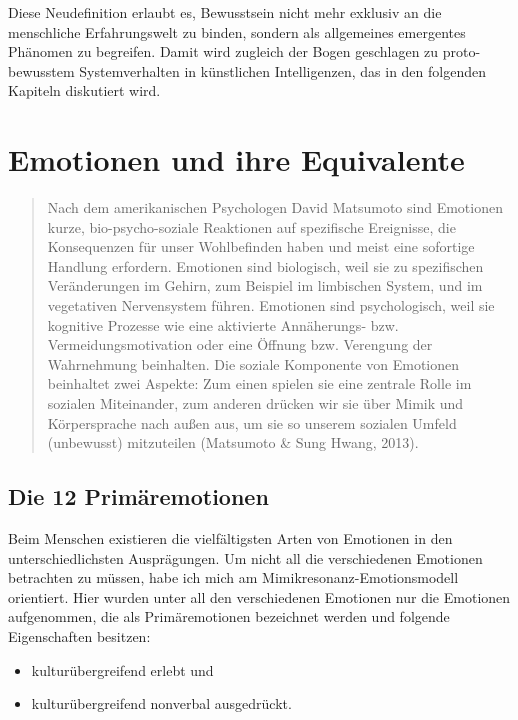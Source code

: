Diese Neudefinition erlaubt es, Bewusstsein nicht mehr exklusiv an die menschliche Erfahrungswelt zu binden, sondern als allgemeines emergentes Phänomen zu begreifen. Damit wird zugleich der Bogen geschlagen zu proto-bewusstem Systemverhalten in künstlichen Intelligenzen, das in den folgenden Kapiteln diskutiert wird.

\section*{Emotionen und ihre Equivalente}
\begin{quotation}
  Nach dem amerikanischen Psychologen David Matsumoto sind Emotionen kurze, bio-psycho-soziale Reaktionen auf spezifische Ereignisse, die Konsequenzen für unser Wohlbefinden haben und meist eine sofortige Handlung erfordern. Emotionen sind biologisch, weil sie zu spezifischen Veränderungen im Gehirn, zum Beispiel im limbischen System, und im vegetativen Nervensystem führen. Emotionen sind psychologisch, weil sie kognitive Prozesse wie eine aktivierte Annäherungs- bzw. Vermeidungsmotivation oder eine Öffnung bzw. Verengung der Wahrnehmung beinhalten. Die soziale Komponente von Emotionen beinhaltet zwei Aspekte: Zum einen spielen sie eine zentrale Rolle im sozialen Miteinander, zum anderen drücken wir sie über Mimik und Körpersprache nach außen aus, um sie so unserem sozialen Umfeld (unbewusst) mitzuteilen (Matsumoto & Sung Hwang, 2013).
\end{quotation}

\subsection*{Die 12 Primäremotionen}
Beim Menschen existieren die vielfältigsten Arten von Emotionen in den unterschiedlichsten Ausprägungen. Um nicht all die verschiedenen Emotionen betrachten zu müssen, habe ich mich am Mimikresonanz-Emotionsmodell orientiert. Hier wurden unter all den verschiedenen Emotionen nur die Emotionen aufgenommen, die als Primäremotionen bezeichnet werden und folgende Eigenschaften besitzen:

\begin{itemize}
  \item kulturübergreifend erlebt und 
  \item kulturübergreifend nonverbal ausgedrückt.
\end{itemize}

